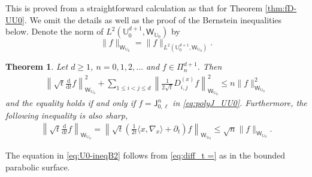 \documentclass{amsart}
\newtheorem{thm}{Theorem}[section]
\theoremstyle{remark}
\def\la{{\langle}}
\def\ra{{\rangle}}
\def\d{\mathrm{d}}
\def\sJ{{\mathsf J}}
\def\sW{{\mathsf W}}
\def\la{{\langle}}
\def\ra{{\rangle}}
\def\UU{{\mathbb U}}
\begin{document}
This is proved from a straightforward calculation as that for Theorem \ref{thm:fD-UU0}. We omit the details as well as the
proof of the Bernstein inequalities below. Denote the norm of $L^2(\UU_0^{d+1}, \sW_{\UU_0})$ by 
$$
   \|f \|_{ \sW_{\UU_0}} = \|f\|_{L^2(\UU_0^{d+1},  \sW_{\UU_0})}.
$$

\begin{thm} \label{thm:B-ineqU0L}
Let $d \ge 1$, $n = 0,1,2,\ldots$ and $f \in \Pi_n^{d+1}$. Then
\begin{align} \label{eq:U0-ineqB}
 \left\| \sqrt{t} \frac{\d}{\d t} f  \right \|_{\sW_{\UU_0}} ^2 
    +  \sum_{1\le i<j\le d} \left \| \frac{1}{2 \sqrt{t}} D_{i, j}^{(x)} f \right \|_{ \sW_{\UU_0}}^2  
        \le n  \|f \|_{ \sW_{\UU_0}}^2 
\end{align} 
and the equality holds if and only if $f = \sJ_{0,\ell}^n$ in \eqref{eq:polyJ_UU0}. 
Furthermore, the following inequality is also sharp, 
\begin{align} \label{eq:U0-ineqB2}
 \left\| \sqrt{t} \frac{\d}{\d t} f  \right \|_{\sW_{\UU_0}} 
   =\left\| \sqrt{t}\left( \frac{1}{2t} \la x ,\nabla_x\ra +\partial_t \right) f\right \|_{\sW_{\UU_0}}  \le \sqrt{n}  \| f \|_{\sW_{\UU_0}}.
\end{align}  
\end{thm}

The equation in \eqref{eq:U0-ineqB2} follows from \eqref{eq:diff_t =} as in the bounded parabolic surface.  
\end{document}

